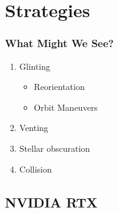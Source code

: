 % 

\section{Strategies}

\begin{frame}\frametitle{What Might We See?}
\begin{enumerate}
	\item Glinting
	\begin{itemize}
		\item Reorientation
		\item Orbit Maneuvers
	\end{itemize}
	\item Venting
	\item Stellar obscuration
	\item Collision
\end{enumerate}
\end{frame}

\subsection{NVIDIA RTX}

\endinput  %
